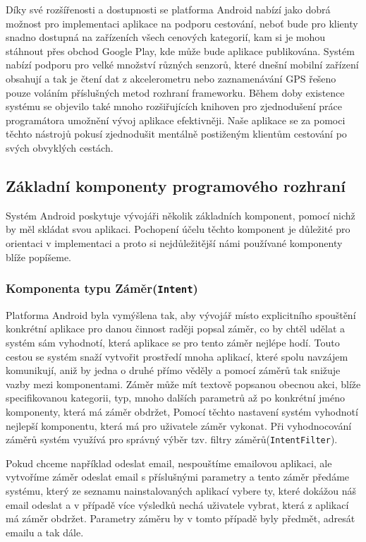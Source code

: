 \documentclass[czech,master,public,dept460,male,java,cpdeclaration]{diploma}
\begin{document}
Díky své rozšířenosti a dostupnosti se platforma Android nabízí jako dobrá možnost pro implementaci
aplikace na podporu cestování, neboť bude pro klienty snadno dostupná na zařízeních všech cenových
kategorií, kam si je mohou stáhnout přes obchod Google Play, kde může bude aplikace publikována.
Systém nabízí podporu pro velké množství různých senzorů, které dnešní mobilní zařízení obsahují
a tak je čtení dat z akcelerometru nebo zaznamenávání GPS řešeno pouze voláním příslušných metod
rozhraní frameworku. Během doby existence systému se objevilo také mnoho rozšiřujících knihoven
pro zjednodušení práce programátora umožnění vývoj aplikace efektivněji. Naše aplikace se
za pomoci těchto nástrojů pokusí zjednodušit mentálně postiženým klientům cestování po svých
obvyklých cestách.

\subsection{Základní komponenty programového rozhraní}
Systém Android poskytuje vývojáři několik základních komponent, pomocí nichž by měl skládat svou aplikaci.
Pochopení účelu těchto komponent je důležité pro orientaci v implementaci a proto si nejdůležitější námi
používané komponenty blíže popíšeme.

\subsubsection{Komponenta typu Záměr(\texttt{Intent})}
Platforma Android byla vymýšlena tak, aby vývojář místo explicitního spouštění konkrétní aplikace pro danou činnost
raději popsal záměr, co by chtěl udělat a systém sám vyhodnotí, která aplikace se pro tento záměr nejlépe
hodí. Touto cestou se systém snaží vytvořit prostředí mnoha aplikací, které spolu navzájem komunikují,
aniž by jedna o druhé přímo věděly a pomocí záměrů tak snižuje vazby mezi komponentami. Záměr může mít
textově popsanou obecnou akci, blíže specifikovanou kategorii, typ, mnoho dalších parametrů až po konkrétní
jméno komponenty, která má záměr obdržet, Pomocí těchto nastavení systém vyhodnotí nejlepší komponentu,
která má pro uživatele záměr vykonat. Při vyhodnocování záměrů systém využívá pro správný výběr
 tzv. filtry záměrů(\texttt{IntentFilter}).

Pokud chceme například odeslat email, nespouštíme emailovou aplikaci, ale vytvoříme záměr odeslat email
s příslušnými parametry a tento záměr předáme systému, který ze seznamu nainstalovaných aplikací vybere
ty, které dokážou náš email odeslat a v případě více výsledků nechá uživatele vybrat, která z aplikací
má záměr obdržet. Parametry záměru by v tomto případě byly předmět, adresát emailu a tak dále.
\end{document}
